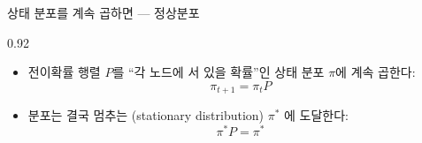 \begin{frame}{상태 분포를 계속 곱하면 --- 정상분포}
\begin{center}\begin{varwidth}{0.92\textwidth}
  \begin{itemize}
    \item 전이확률 행렬 $P$를 ``각 노드에 서 있을 확률''인
      상태 분포 $\pi$에 계속 곱한다:
      \[ \pi_{t+1} = \pi_t P \]
    \item 분포는 결국 멈추는 (stationary distribution)
      $\pi^*$ 에 도달한다:
      \[ \pi^* P = \pi^* \]
    
  \end{itemize}
\end{varwidth}\end{center}
\end{frame}
